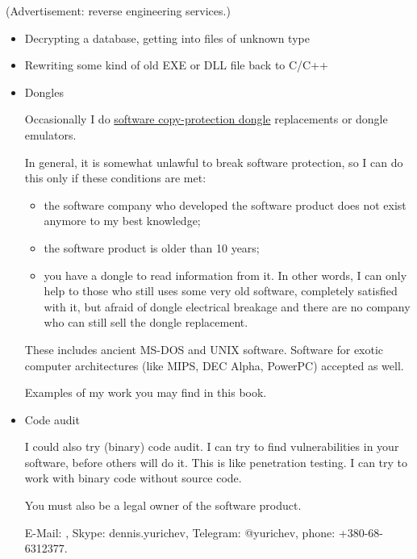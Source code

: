 
(Advertisement: reverse engineering services.)

\begin{itemize}
\item Decrypting a database, getting into files of unknown type

\item Rewriting some kind of old EXE or DLL file back to C/C++

\item Dongles

Occasionally I do \href{https://en.wikipedia.org/wiki/Software_protection_dongle}{software copy-protection dongle} replacements or dongle emulators.

In general, it is somewhat unlawful to break software protection, so I can do this only if these conditions are met:

	\begin{itemize}
	\item the software company who developed the software product does not exist anymore to my best knowledge;
	\item the software product is older than 10 years;
	\item you have a dongle to read information from it. In other words, I can only help to those who still uses some very old software, completely satisfied with it, but afraid of dongle electrical breakage and there are no company who can still sell the dongle replacement.
	\end{itemize}

These includes ancient MS-DOS and UNIX software. Software for exotic computer architectures (like MIPS, DEC Alpha, PowerPC) accepted as well.

Examples of my work you may find in this book.

\item Code audit

I could also try (binary) code audit.
I can try to find vulnerabilities in your software, before others will do it.
This is like penetration testing.
I can try to work with binary code without source code.

You must also be a legal owner of the software product.

E-Mail: \EMAIL{}, Skype: dennis.yurichev, Telegram: @yurichev, phone: +380-68-6312377.

\end{itemize}

